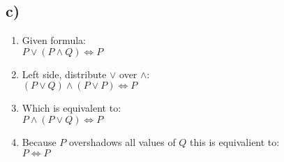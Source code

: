 \documentclass{article}
\begin{document}
\subsection*{c)}
\begin{enumerate}
  \item Given formula: \\ $P \vee (P \wedge Q) \Leftrightarrow P$
  \item Left side, distribute $\vee$ over $\wedge$: \\ $(P \vee Q) \wedge (P \vee P) \Leftrightarrow P$
  \item Which is equivalent to: \\ $P \wedge (P \vee Q) \Leftrightarrow P$
  \item Because $P$ overshadows all values of $Q$ this is equivalient to: \\ $P \Leftrightarrow P$
\end{enumerate}

%  
% 
\end{document}
